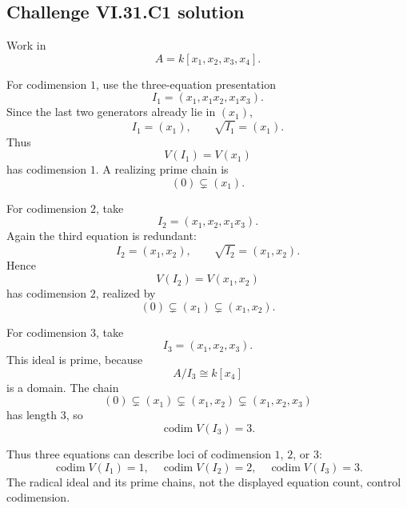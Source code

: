 
\subsection*{Challenge VI.31.C1 solution}
\begin{solution}
Work in
\[
A=k[x_1,x_2,x_3,x_4].
\]

For codimension \(1\), use the three-equation presentation
\[
I_1=(x_1,x_1x_2,x_1x_3).
\]
Since the last two generators already lie in \((x_1)\),
\[
I_1=(x_1),
\qquad
\sqrt{I_1}=(x_1).
\]
Thus
\[
V(I_1)=V(x_1)
\]
has codimension \(1\).  A realizing prime chain is
\[
(0)\subsetneq(x_1).
\]

For codimension \(2\), take
\[
I_2=(x_1,x_2,x_1x_3).
\]
Again the third equation is redundant:
\[
I_2=(x_1,x_2),
\qquad
\sqrt{I_2}=(x_1,x_2).
\]
Hence
\[
V(I_2)=V(x_1,x_2)
\]
has codimension \(2\), realized by
\[
(0)\subsetneq(x_1)\subsetneq(x_1,x_2).
\]

For codimension \(3\), take
\[
I_3=(x_1,x_2,x_3).
\]
This ideal is prime, because
\[
A/I_3\cong k[x_4]
\]
is a domain.  The chain
\[
(0)\subsetneq(x_1)\subsetneq(x_1,x_2)\subsetneq(x_1,x_2,x_3)
\]
has length \(3\), so
\[
\operatorname{codim}V(I_3)=3.
\]

Thus three equations can describe loci of codimension \(1\), \(2\), or \(3\):
\[
\boxed{
\operatorname{codim}V(I_1)=1,\quad
\operatorname{codim}V(I_2)=2,\quad
\operatorname{codim}V(I_3)=3.
}
\]
The radical ideal and its prime chains, not the displayed equation count, control codimension.
\end{solution}

